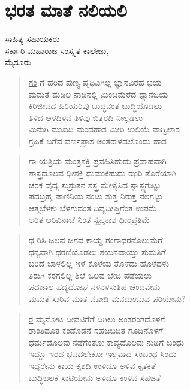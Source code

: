 \chapter{ಭರತ ಮಾತೆ ನಲಿಯಲಿ}

\begin{center}
\smallskip
ಸಾಹಿತ್ಯ ಸಹಾಯಕರು\\
ಸರ್ಕಾರಿ ಮಹಾರಾಜ ಸಂಸ್ಕೃತ ಕಾಲೇಜು,\\
ಮೈಸೂರು

\end{center}
\begin{verse}
\underline{ಗಂ} ಗೆ 	ಹರಿದ 	ಪುಣ್ಯ ಪೃಥಿವಿಗಿಲ್ಲ 	ಜ್ಞಾನವಿರಹ 	ಭಯ\\
ಮಮತೆ ಮಡಿಲ ನಾಡಿನಲ್ಲಿ ಮಿಂಚಿಮೆರೆದ ಧ್ಯಾನಜಯ\\
ಕಿರಿಜೀವದ ಹಿರಿಯರಿವು ಬುದ್ಧನಂತ ಬುದ್ಧಿಯೊಡಲು\\
ತಿಳಿದ ಆಳದಿಳಿವ ತಿಳಿವು ಬಿತ್ತರದಿ ನೀಲ್ಗಡಲು\\
ಮಿನುಗಿ ಮುಖದಿ ಮಂದಹಾಸ ಮೀರಿ ಉಲಿಯೆ ವಾಗ್ವಿಲಾಸ\\
ಗ್ರಹಿಕೆ ಬಗೆವ ವರ್ಣಪ್ರಾಸ ಅಂತರಾಳದಲೊಂದು ಹಾಸ
\end{verse}
\begin{verse}
\underline{ಗಾ} ಯತ್ರಿಯ ಮಂತ್ರಶಕ್ತಿ ಪ್ರವಹಿಸಿಹುದು ಪ್ರವಾಹವಾಗಿ\\
ಶಾಸ್ತ್ರದೊಲವ ಧೀಶಕ್ತಿ ಧುಮುಕಿಹುದು ಝರಿ-ತೊರೆಯಾಗಿ\\
ಚರಕ ವೈದ್ಯ ಸುಶ್ರುತನ ಶಸ್ತ್ರ ಮೇಳೈಸಿದ ಸ್ವಾಸ್ಥ್ಯಗುಟ್ಟು\\
ಪದಬ್ರಹ್ಮ ಪಾಣಿನಿಯ ನಂಟು ಸುತ್ತ ನಿರುಕ್ತ ನೆಲಗಟ್ಟು\\
ಆತ್ಮಬೆಳಕು ಬೆಳಗುವಂತ ದಿವ್ಯದೀಪ್ತಿಗೆಂತ ಉಪಮೆ\\
ಅರಿತ ಅರಿವಿನಾಚೆ ನಿಂತ ಸ್ವಪ್ರಕಾಶ ಧೀರಪ್ರತಿಮೆ
\end{verse}
\begin{verse}
\underline{ಧ} ರಿಸಿ ಜಲವ ಜಗವ ಕಾಯ್ದ ಗಂಗಾಧರನೊಲುಮೆಗೆ\\
ಧನ್ಯವಾಗಿ ಧರಣಿಯೊಡಲು ಶಯನವಾಯ್ತು ಸುಮತಿಗೆ\\
ಬರಿದೆ ಬಾಳಲಿಲ್ಲ ಇಳೆ ಕೊಳೆಯ ತೊಳೆದು ಹೊಳೆದಳು\\
ತಿರುಗಿ ಕರಗಲಿಲ್ಲ ಶಿಲೆ ಒಲವ ಬೇಡಿ ಪಡೆಯಲು\\
ಪದಜಾಲ ಪದ್ಯದೋಘ ನಳನಳಿಸುತಿಹ ಚೆಂದವೇನು\\
ಮಮತೆ ಸುರಿವ ಮಾತ ಮೋಡಿ ಮನದುಂಬುವ ಪರಿಯೇನು?
\end{verse}
\begin{verse}
\underline{ರ} ಮ್ಯನೋಟ ದೀವಟಿಗೆಗೆ ದಿಗಿಲು ಅಂತರಂಗದೊಳಗೆ\\
ಶಾಂತಿದೂತ ಕಂಡೊಡನೆ ಸಹಜಬಡಿತ ಗೂಡಿನೊಳಗೆ\\
ಧರ್ಮದೊಲವು ನಡೆಗೆಂತೋ ಕಾವ್ಯದೊಲವು ನುಡಿಗೆ ಬಂಧು\\
ಇದ್ದೂ ಇರದ ಭವದಲೇಕೋ ಇಲ್ಲವಾದ ಸಂಬಂಧ ಸಿಂಧು\\
ಇದ್ದರೇನು ಕಾಯ ಕೃಶದಿ ಉಳಿದೂ ಅಳಿವ ಕೃತಕತೆ\\
ಬುದ್ಧಿಬಲಕೆ ಸಾಟಿಯೇನು ಅಳಿದೂ ಉಳಿವ ಸಹಜತೆ
\end{verse}
